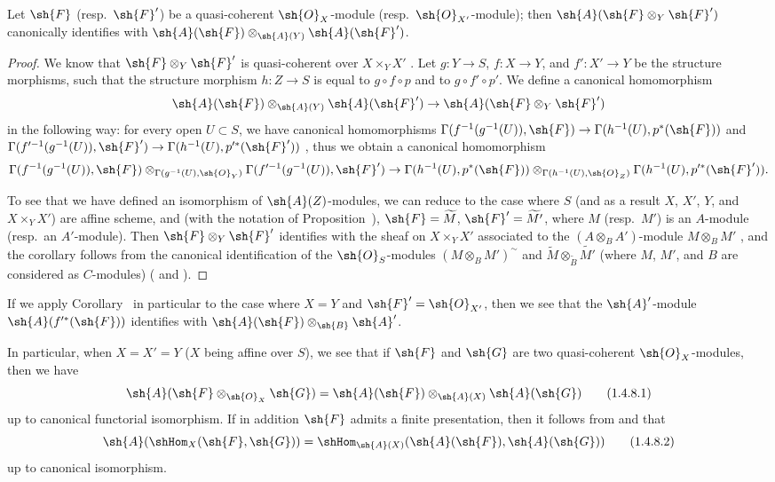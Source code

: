\begin{corollary}[1.4.7]
\label{2.1.4.7}
Let $\sh{F}$ (resp.~$\sh{F}'$) be a quasi-coherent $\sh{O}_X$-module (resp.~$\sh{O}_{X'}$-module); then $\sh{A}(\sh{F}\otimes_Y\sh{F}')$ canonically identifies with $\sh{A}(\sh{F})\otimes_{\sh{A}(Y)}\sh{A}(\sh{F}')$.
\end{corollary}

\begin{proof}
\label{proof-2.1.4.7}
We know that $\sh{F}\otimes_Y\sh{F}'$ is quasi-coherent over $X\times_Y X'$ .
Let $g:Y\to S$, $f:X\to Y$, and $f':X'\to Y$ be the structure morphisms, such that the structure morphism
$h:Z\to S$ is equal to $g\circ f\circ p$ and to $g\circ f'\circ p'$.
We define a canonical homomorphism
\[
  \sh{A}(\sh{F})\otimes_{\sh{A}(Y)}\sh{A}(\sh{F}')\to\sh{A}(\sh{F}\otimes_Y\sh{F}')
\]
in the following way: for every open $U\subset S$, we have canonical homomorphisms $\Gamma(f^{-1}(g^{-1}(U)),\sh{F})\to\Gamma(h^{-1}(U),p^*(\sh{F}))$ and $\Gamma(f^{\prime-1}(g^{-1}(U)),\sh{F}')\to\Gamma(h^{-1}(U),p^{\prime*}(\sh{F}'))$ , thus we obtain a canonical homomorphism
\[
  \Gamma(f^{-1}(g^{-1}(U)),\sh{F})\otimes_{\Gamma(g^{-1}(U),\sh{O}_Y)}\Gamma(f^{\prime-1}(g^{-1}(U)),\sh{F}')\to\Gamma(h^{-1}(U),p^*(\sh{F}))\otimes_{\Gamma(h^{-1}(U),\sh{O}_Z)}\Gamma(h^{-1}(U),p^{\prime*}(\sh{F}')).
\]

To see that we have defined an isomorphism of $\sh{A}(Z)$-modules, we can reduce to the case where $S$ (and as a result $X$, $X'$, $Y$, and $X\times_Y X'$) are affine scheme, and (with the notation of Proposition~), $\sh{F}=\widetilde{M}$, $\sh{F}'=\widetilde{M'}$, where $M$ (resp.~$M'$) is an $A$-module (resp.~an $A'$-module).
Then $\sh{F}\otimes_Y\sh{F}'$ identifies with the sheaf on $X\times_Y X'$ associated to the $(A\otimes_B A')$-module $M\otimes_B M'$ , and the corollary follows from the canonical identification of the $\sh{O}_S$-modules $(M\otimes_B M')^\sim$ and $\widetilde{M}\otimes_{\widetilde{B}}\widetilde{M'}$ (where $M$, $M'$, and $B$ are considered as $C$-modules) ( and ).
\end{proof}

If we apply Corollary~ in particular to the case where $X=Y$ and $\sh{F}'=\sh{O}_{X'}$, then we see that the $\sh{A}'$-module $\sh{A}(f^{\prime*}(\sh{F}))$ identifies with $\sh{A}(\sh{F})\otimes_\sh{B}\sh{A}'$.

\begin{env}[1.4.8]
\label{2.1.4.8}
In particular, when $X=X'=Y$ ($X$ being affine over $S$), we see that if $\sh{F}$ and $\sh{G}$ are two quasi-coherent $\sh{O}_X$-modules, then we have
\[
\label{eq:2.1.4.8.1}
  \sh{A}(\sh{F}\otimes_{\sh{O}_X}\sh{G})=\sh{A}(\sh{F})\otimes_{\sh{A}(X)}\sh{A}(\sh{G})
  \tag{1.4.8.1}
\]
up to canonical functorial isomorphism.
If in addition $\sh{F}$ admits a finite presentation, then it follows from  and  that
\[
\label{eq:2.1.4.8.2}
  \sh{A}(\shHom_X(\sh{F},\sh{G}))=\shHom_{\sh{A}(X)}(\sh{A}(\sh{F}),\sh{A}(\sh{G}))
  \tag{1.4.8.2}
\]
up to canonical isomorphism.
\end{env}

